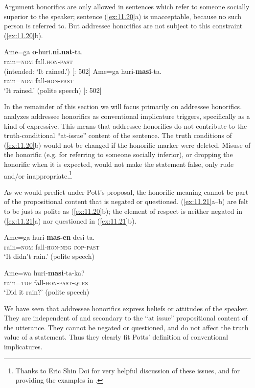 Argument honorifics are only allowed in sentences which refer to someone socially superior to the speaker; sentence (\ref{ex:11.20}a) is unacceptable, because no such person is referred to. But addressee honorifics are not subject to this constraint (\ref{ex:11.20}b).


\ea \label{ex:11.20} \ea  \gll *Ame=ga  \textbf{o}-huri.\textbf{ni.nat}-ta.\\
  rain=\textsc{nom}  fall.\textsc{hon-past}\\
\glt (intended: ‘It rained.’)  [\citealt{Harada1976}: 502]
\ex \gll
Ame=ga  huri-\textbf{masi}-ta.\\
rain=\textsc{nom}  fall-\textsc{hon-past}\\
\glt ‘It rained.’  (polite speech)   [\citealt{Harada1976}: 502]
\z \z


In the remainder of this section we will focus primarily on addressee honorifics. \citet{Potts2005} analyzes addressee honorifics as conventional implicature triggers, specifically as a kind of expressive. This means that addressee honorifics do not contribute to the truth-conditional “at-issue” content of the sentence. The truth conditions of (\ref{ex:11.20}b) would not be changed if the honorific marker were deleted. Misuse of the honorific (e.g. for referring to someone socially inferior), or dropping the honorific when it is expected, would not make the statement false, only rude and/or inappropriate.\footnote{Thanks to Eric Shin Doi for very helpful discussion of these issues, and for providing the examples in .}



As we would predict under Pott’s proposal, the honorific meaning cannot be part of the propositional content that is negated or questioned. (\ref{ex:11.21}a--b) are felt to be just as polite as (\ref{ex:11.20}b); the element of respect is neither negated in (\ref{ex:11.21}a) nor questioned in (\ref{ex:11.21}b).


\ea \label{ex:11.21}
\ea  \gll Ame=ga  huri-\textbf{mas-en}  desi-ta.\\
rain=\textsc{nom}  fall-\textsc{hon-neg  cop-past}\\
\glt ‘It didn’t rain.’  (polite speech)

\ex
 \gll  Ame=wa  huri-\textbf{masi}-ta-ka?\\
rain=\textsc{top}  fall-\textsc{hon-past-ques}\\
\glt ‘Did it rain?’  (polite speech)
\z \z


We have seen that addressee honorifics express beliefs or attitudes of the speaker. They are independent of and secondary to the “at issue” propositional content of the utterance. They cannot be negated or questioned, and do not affect the truth value of a statement. Thus they clearly fit Potts’ definition of conventional implicatures.


